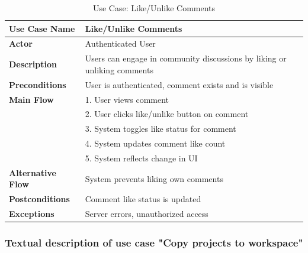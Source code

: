 \begin{table}[H]
\centering
\caption{Use Case: Like/Unlike Comments}
\begin{tabular}{|p{3cm}|p{10cm}|}
\hline
\textbf{Use Case Name} & Like/Unlike Comments \\
\hline
\textbf{Actor} & Authenticated User \\
\hline
\textbf{Description} & Users can engage in community discussions by liking or unliking comments \\
\hline
\textbf{Preconditions} & User is authenticated, comment exists and is visible \\
\hline
\textbf{Main Flow} & 
1. User views comment \\
& 2. User clicks like/unlike button on comment \\
& 3. System toggles like status for comment \\
& 4. System updates comment like count \\
& 5. System reflects change in UI \\
\hline
\textbf{Alternative Flow} & System prevents liking own comments \\
\hline
\textbf{Postconditions} & Comment like status is updated \\
\hline
\textbf{Exceptions} & Server errors, unauthorized access \\
\hline
\end{tabular}
\end{table}

\subsubsection{Textual description of use case "Copy projects to workspace"}

